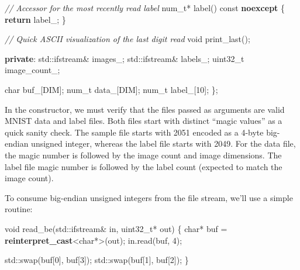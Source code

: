 \documentclass[
]{article}
\newenvironment{Shaded}{}{}
\newcommand{\AttributeTok}[1]{\textcolor[rgb]{0.49,0.56,0.16}{#1}}
\newcommand{\BuiltInTok}[1]{#1}
\newcommand{\CommentTok}[1]{\textcolor[rgb]{0.38,0.63,0.69}{\textit{#1}}}
\newcommand{\ControlFlowTok}[1]{\textcolor[rgb]{0.00,0.44,0.13}{\textbf{#1}}}
\newcommand{\DataTypeTok}[1]{\textcolor[rgb]{0.56,0.13,0.00}{#1}}
\newcommand{\DecValTok}[1]{\textcolor[rgb]{0.25,0.63,0.44}{#1}}
\newcommand{\KeywordTok}[1]{\textcolor[rgb]{0.00,0.44,0.13}{\textbf{#1}}}
\newcommand{\NormalTok}[1]{#1}
\newcommand{\VariableTok}[1]{\textcolor[rgb]{0.10,0.09,0.49}{#1}}
\begin{document}
\begin{Shaded}
\begin{Highlighting}[]
    \CommentTok{// Accessor for the most recently read label}
    \DataTypeTok{num\_t}\NormalTok{* label() }\AttributeTok{const} \KeywordTok{noexcept}
\NormalTok{    \{}
        \ControlFlowTok{return} \VariableTok{label\_}\NormalTok{;}
\NormalTok{    \}}
    
    \CommentTok{// Quick ASCII visualization of the last digit read}
    \DataTypeTok{void}\NormalTok{ print\_last();}
    
\KeywordTok{private}\NormalTok{:}
    \BuiltInTok{std::}\NormalTok{ifstream\& }\VariableTok{images\_}\NormalTok{;}
    \BuiltInTok{std::}\NormalTok{ifstream\& }\VariableTok{labels\_}\NormalTok{;}
    \DataTypeTok{uint32\_t} \VariableTok{image\_count\_}\NormalTok{;}

    \DataTypeTok{char} \VariableTok{buf\_}\NormalTok{[DIM];}
    \DataTypeTok{num\_t} \VariableTok{data\_}\NormalTok{[DIM];}
    \DataTypeTok{num\_t} \VariableTok{label\_}\NormalTok{[}\DecValTok{10}\NormalTok{];}
\NormalTok{\};}
\end{Highlighting}
\end{Shaded}

In the constructor, we must verify that the files passed as arguments
are valid MNIST data and label files. Both files start with distinct
``magic values'' as a quick sanity check. The sample file starts with
2051 encoded as a 4-byte big-endian unsigned integer, whereas the label
file starts with 2049. For the data file, the magic number is followed
by the image count and image dimensions. The label file magic number is
followed by the label count (expected to match the image count).

To consume big-endian unsigned integers from the file stream, we'll use
a simple routine:

\begin{Shaded}
\begin{Highlighting}[]
\DataTypeTok{void}\NormalTok{ read\_be(}\BuiltInTok{std::}\NormalTok{ifstream\& in, }\DataTypeTok{uint32\_t}\NormalTok{* out)}
\NormalTok{\{}
    \DataTypeTok{char}\NormalTok{* buf = }\KeywordTok{reinterpret\_cast}\NormalTok{\textless{}}\DataTypeTok{char}\NormalTok{*\textgreater{}(out);}
\NormalTok{    in.read(buf, }\DecValTok{4}\NormalTok{);}

    \BuiltInTok{std::}\NormalTok{swap(buf[}\DecValTok{0}\NormalTok{], buf[}\DecValTok{3}\NormalTok{]);}
    \BuiltInTok{std::}\NormalTok{swap(buf[}\DecValTok{1}\NormalTok{], buf[}\DecValTok{2}\NormalTok{]);}
\NormalTok{\}}
\end{Highlighting}
\end{Shaded}
\end{document}
